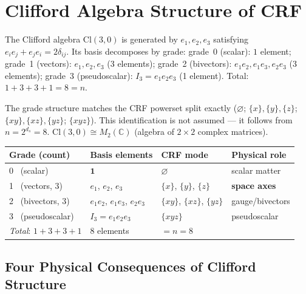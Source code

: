 \documentclass[12pt, a4paper]{article}
\begin{document}
\section{Clifford Algebra Structure of CRF}

\begin{derivedbox}[title={$n=8$ CRF Modes $=$ Basis of Clifford Algebra $\mathrm{Cl}(3,0)$}]
The Clifford algebra $\mathrm{Cl}(3,0)$ is generated by $e_1,e_2,e_3$ satisfying
$e_ie_j + e_je_i = 2\delta_{ij}$. Its basis decomposes by grade:
grade~0 (scalar): $1$ element; grade~1 (vectors): $e_1,e_2,e_3$ (3 elements);
grade~2 (bivectors): $e_1e_2,e_1e_3,e_2e_3$ (3 elements);
grade~3 (pseudoscalar): $I_3=e_1e_2e_3$ (1 element). Total: $1+3+3+1=8=n$.

The grade structure matches the CRF powerset split exactly
($\varnothing$; $\{x\},\{y\},\{z\}$; $\{xy\},\{xz\},\{yz\}$; $\{xyz\}$).
This identification is not assumed --- it follows from $n = 2^{d_s} = 8$.
$\mathrm{Cl}(3,0) \cong M_2(\mathbb{C})$ (algebra of $2\times2$ complex matrices).
\end{derivedbox}

\begin{center}
\renewcommand{\arraystretch}{1.3}
\begin{tabular}{p{1.5cm} p{4.0cm} p{3.2cm} p{3.0cm}}
\toprule
\textbf{Grade} (count) & \textbf{Basis elements} & \textbf{CRF mode} & \textbf{Physical role} \\
\midrule
0 \ (scalar) & $\mathbf{1}$ & $\varnothing$ & scalar matter \\
1 \ (vectors, 3) & $e_1$, $e_2$, $e_3$ & $\{x\}$, $\{y\}$, $\{z\}$ & \textbf{space axes} \\
2 \ (bivectors, 3) & $e_1e_2$, $e_1e_3$, $e_2e_3$ & $\{xy\}$, $\{xz\}$, $\{yz\}$ & gauge/bivectors \\
3 \ (pseudoscalar) & $I_3 = e_1e_2e_3$ & $\{xyz\}$ & pseudoscalar \\
\midrule
\textit{Total}: $1{+}3{+}3{+}1$ & 8 elements & $= n = 8$ & \\
\bottomrule
\end{tabular}
\end{center}

\subsection{Four Physical Consequences of Clifford Structure}
\end{document}
